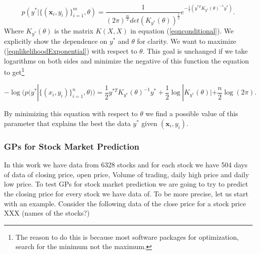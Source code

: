\documentclass{article}
\newcommand{\x}{\textbf{x}}
\begin{document}
\begin{equation}\label{eqnlikelihoodExponential}
p(y^{*}|\{(\x_{i},y_{i})\}_{i=1}^{m},\theta)=\frac{1}{(2\pi)^{\frac{m}{2}}det(K_{y^{*}}(\theta))^{\frac{1}{2}}}
e^{-\frac{1}{2}(y^{*T}K_{y^{*}}(\theta)^{-1}y^{*})}.
\end{equation}
Where $K_{y^{*}}(\theta)$ is the matrix $K(X,X)$ in equation (\ref{eqnconditional}). We explicitly
show the dependence on $y^{*}$ and $\theta$ for clarity. We want to maximize (\ref{eqnlikelihoodExponential})
with respect to $\theta$.
This goal is unchanged if we take logarithms on both sides and minimize the negative
of this function  the equation to get\footnote{The reason to do this is because most
software packages for optimization, search for the minimum not the maximum.}


\begin{equation}\label{eqnloglikelihood}
-\log(p(y^{*}|\{(x_{i},y_{i})\}_{i=1}^{n},\theta))=\frac{1}{2}y^{*T}K_{y^{*}}(\theta)^{-1}y^{*}+
\frac{1}{2}\log|K_{y^{*}}(\theta)|+\frac{n}{2}\log(2\pi).
\end{equation}

By minimizing this equation with respect to $\theta$ we find a possible value of this parameter
that explains the best the data $y^{*}$ given $(\x_{i},y_{i})$.

\subsubsection*{GPs for Stock Market Prediction}
In this work we have data from 6328 stocks and for each stock we have 504 days of data of closing price, open price,
Volume of trading, daily high price and daily low price. To test GPs for stock market prediction we are going
to try to predict the closing price for every stock we have data of. To be more precise, let us start with an 
example.  Consider the following data of the close price for a stock price XXX (names of the stocks?)
\end{document}
